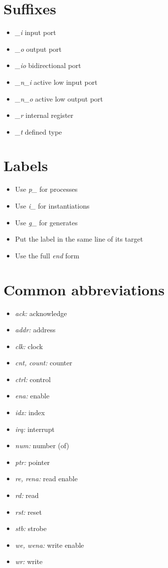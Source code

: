 \documentclass{article}
\begin{document}
\begin{multicols}{3}
  \section*{Suffixes}
    \begin{itemize}
      \item \textit{\_i} input port
      \item \textit{\_o} output port
      \item \textit{\_io} bidirectional port
      \item \textit{\_n\_i} active low input port
      \item \textit{\_n\_o} active low output port
      \item \textit{\_r} internal register
      \item \textit{\_t} defined type
    \end{itemize}
  \section*{Labels}
    \begin{itemize}
      \item Use \textit{p\_} for processes
      \item Use \textit{i\_} for instantiations
      \item Use \textit{g\_} for generates
      \item Put the label in the same line of its target
      \item Use the full \textit{end} form
    \end{itemize}
  \section*{Common abbreviations}
    \begin{itemize}
      \item \textit{ack:} acknowledge
      \item \textit{addr:} address
      \item \textit{clk:} clock
      \item \textit{cnt, count:} counter
      \item \textit{ctrl:} control
      \item \textit{ena:} enable
      \item \textit{idx:} index
      \item \textit{irq:} interrupt
      \item \textit{num:} number (of)
      \item \textit{ptr:} pointer
      \item \textit{re, rena:} read enable
      \item \textit{rd:} read
      \item \textit{rst:} reset
      \item \textit{stb:} strobe
      \item \textit{we, wena:} write enable
      \item \textit{wr:} write
    \end{itemize}
\end{multicols}
\end{document}
